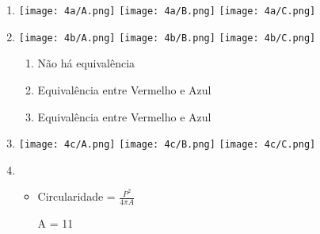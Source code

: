 \begin{question}
    
    \begin{enumerate}[label=\textbf{\alph*})]
        \item 
        \begin{minipage}{\linewidth}
            \centering
            \texttt{[image: 4a/A.png]}
            \hspace*{1cm}
            \texttt{[image: 4a/B.png]}
            \hspace*{1cm}
            \texttt{[image: 4a/C.png]}
        \end{minipage}

        \item 
        \begin{minipage}{\linewidth}
            \centering
            \texttt{[image: 4b/A.png]}
            \hspace*{1cm}
            \texttt{[image: 4b/B.png]}
            \hspace*{1cm}
            \texttt{[image: 4b/C.png]}
        \end{minipage}

        \begin{enumerate}[label=\textbf{\alph*)}]
            \item Não há equivalência
            \item Equivalência entre Vermelho e Azul
            \item Equivalência entre Vermelho e Azul
        \end{enumerate}

        \item 
        \begin{minipage}{\linewidth}
            \centering
            \texttt{[image: 4c/A.png]}
            \hspace*{1cm}
            \texttt{[image: 4c/B.png]}
            \hspace*{1cm}
            \texttt{[image: 4c/C.png]}
        \end{minipage}

        \item 

        \begin{itemize}
            \item Circularidade = $\frac{P^{2}}{4\pi A}$
            
                A = 11
                

\end{itemize}
\end{enumerate}
\end{question}
